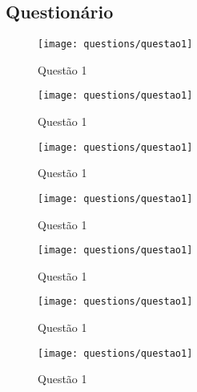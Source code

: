 \begin{apendicesenv} 

\partapendices

\chapter{Questionário} \label{apen:questionario}

\begin{figure}[H]
	\centering
	\texttt{[image: questions/questao1]}
	\caption[Questão 1]{Questão 1}
	\label{fig:quest}
\end{figure}
\begin{figure}[H]
	\centering
	\texttt{[image: questions/questao1]}
	\caption[Questão 1]{Questão 1}
	\label{fig:quest}
\end{figure}
\begin{figure}[H]
	\centering
	\texttt{[image: questions/questao1]}
	\caption[Questão 1]{Questão 1}
	\label{fig:quest}
\end{figure}
\begin{figure}[H]
	\centering
	\texttt{[image: questions/questao1]}
	\caption[Questão 1]{Questão 1}
	\label{fig:quest}
\end{figure}
\begin{figure}[H]
	\centering
	\texttt{[image: questions/questao1]}
	\caption[Questão 1]{Questão 1}
	\label{fig:quest}
\end{figure}
\begin{figure}[H]
	\centering
	\texttt{[image: questions/questao1]}
	\caption[Questão 1]{Questão 1}
	\label{fig:quest}
\end{figure}
\begin{figure}[H]
	\centering
	\texttt{[image: questions/questao1]}
	\caption[Questão 1]{Questão 1}
	\label{fig:quest}
\end{figure}


\end{apendicesenv}
